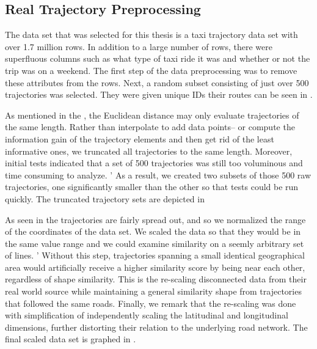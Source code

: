 \subsection{Real Trajectory Preprocessing}

The data set that was selected for this thesis is a taxi trajectory data set with  over 1.7 million rows\cite{3-TaxiTrajectory}. 
In addition to a large number of rows, there were superfluous columns such as what type of taxi ride it was and whether or not the trip was on a weekend. 
The first step of the data preprocessing was to remove these attributes from the rows.  
Next, a random subset consisting of just over 500 trajectories was selected. 
They were given unique IDs their routes can be seen in . 


\clearpage
As mentioned in the , the Euclidean distance may only evaluate trajectories of the same length. 
Rather than interpolate to add data points– or compute the information gain of the trajectory elements and then get rid of the least informative ones, we truncated all trajectories to the same length. 
Moreover, initial tests indicated that a set of 500 trajectories was still too voluminous and time consuming to analyze. '
As a result, we created two subsets of those 500 raw trajectories, one significantly smaller than the other so that tests could be run quickly. The truncated trajectory sets are depicted in 



As seen in  the trajectories are fairly spread out, and so we normalized the range of the coordinates of the data set.
We scaled the data so that they would be in the same value range and we could examine similarity on a seemly arbitrary set of lines. '
Without this step, trajectories spanning a small identical geographical area would artificially receive a higher similarity score by being near each other, regardless of shape similarity.
This is the re-scaling disconnected data from their real world source while maintaining a general similarity shape from trajectories that followed the same roads. 
Finally, we remark that the re-scaling was done with simplification of independently scaling the latitudinal and longitudinal dimensions, further distorting their relation to the underlying road network. 
The final scaled data set is graphed in .



